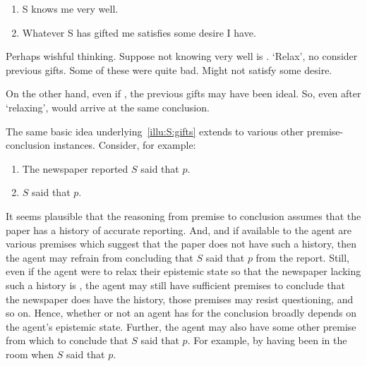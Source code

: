 \begin{note}[Gifts]
  \begin{illustration}
    \label{illu:S:gifts}
    \begin{enumerate}
    \item S knows me very well.
    \item Whatever S has gifted me satisfies some desire I have.
    \end{enumerate}
  \end{illustration}
  Perhaps wishful thinking.
  Suppose not knowing very well is \epPAd{}.
  `Relax', no consider previous gifts.
  Some of these were quite bad.
  Might not satisfy some desire.

  On the other hand, even if \epPAd{}, the previous gifts may have been ideal.
  So, even after `relaxing', would arrive at the same conclusion.

  The same basic idea underlying~\autoref{illu:S:gifts} extends to various other premise-conclusion instances.
  Consider, for example:
  \begin{enumerate}
  \item The newspaper reported \(S\) said that \(p\).
  \item \(S\) said that \(p\).
  \end{enumerate}
  It seems plausible that the reasoning from premise to conclusion assumes that the paper has a history of accurate reporting.
  And, and if available to the agent are various premises which suggest that the paper does not have such a history, then the agent may refrain from concluding that \(S\) said that \(p\) from the report.
  Still, even if the agent were to relax their epistemic state so that the newspaper lacking such a history is \epVAd{}, the agent may still have sufficient premises to conclude that the newspaper does have the history, those premises may resist questioning, and so on.
  Hence, whether or not an agent has \support{} for the conclusion broadly depends on the agent's epistemic state.
  Further, the agent may also have some other premise from which to conclude that \(S\) said that \(p\).
  For example, by having been in the room when \(S\) said that \(p\).
\end{note}

